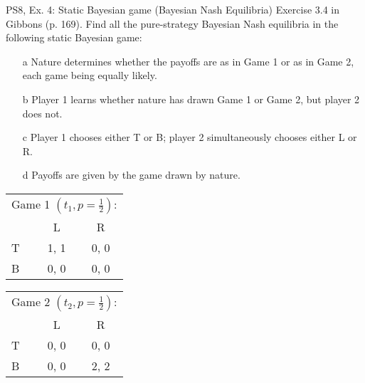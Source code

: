 \begin{frame}{PS8, Ex. 4: Static Bayesian game (Bayesian Nash Equilibria)}
Exercise 3.4 in Gibbons (p. 169). Find all the pure-strategy Bayesian Nash equilibria in the following static Bayesian game:
\begin{itemize}
    \item[a] Nature determines whether the payoffs are as in Game 1 or as in Game 2, each game being equally likely.
    \item[b] Player 1 learns whether nature has drawn Game 1 or Game 2, but player 2 does not.
    \item[c] Player 1 chooses either T or B; player 2 simultaneously chooses either L or R.
    \item[d] Payoffs are given by the game drawn by nature.
\end{itemize}
    \begin{table}
      \begin{tabular}{l|c|c|}
        \multicolumn{3}{c}{Game 1 $\left(t_1, p=\frac{1}{2}\right)$:}
        \\
        \multicolumn{1}{c}{} & \multicolumn{1}{c}{L} & \multicolumn{1}{c}{R} \\\cline{2-3}
        T & 1, 1 & 0, 0 \\\cline{2-3}
        B & 0, 0 & 0, 0 \\\cline{2-3}
      \end{tabular}
      \begin{tabular}{l|c|c|}
        \multicolumn{3}{c}{Game 2 $\left(t_2, p=\frac{1}{2}\right)$:}
        \\
        \multicolumn{1}{c}{} & \multicolumn{1}{c}{L} & \multicolumn{1}{c}{R} \\\cline{2-3}
        T & 0, 0 & 0, 0 \\\cline{2-3}
        B & 0, 0 & 2, 2 \\\cline{2-3}
      \end{tabular}
    \end{table}
    \vfill\null
\end{frame}

